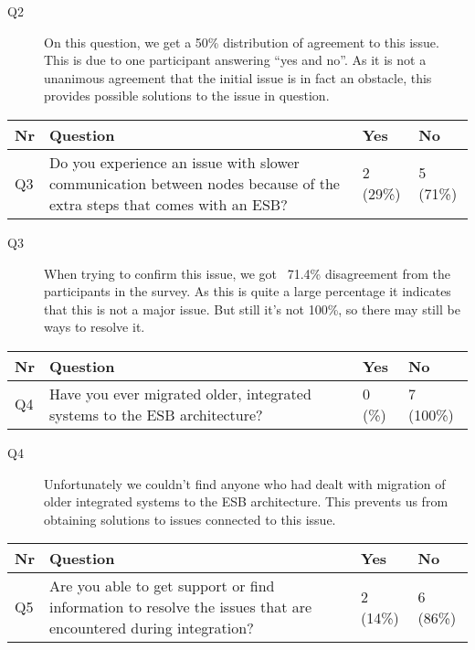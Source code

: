 \documentclass{llncs}
\begin{document}
\begin{description}
\item[Q2] On this question, we get a 50\% distribution of agreement to this issue. This is due to one participant answering “yes and no”. As it is not a unanimous agreement that the initial issue is in fact an obstacle, this provides possible solutions to the issue in question.
\end{description}

\begin{tabular}{ | l | p{9cm} | l | l |}
\hline
Nr & Question & Yes & No \\ \hline
Q3 & Do you experience an issue with slower communication between nodes because of the extra steps that comes with an ESB? & 2 (29\%) & 5 (71\%) \\ \hline
\end{tabular}

\begin{description}
\item[Q3] When trying to confirm this issue, we got ~71.4\% disagreement from the participants in the survey. As this is quite a large percentage it indicates that this is not a major issue. But still it’s not 100\%, so there may still be ways to resolve it.
\end{description}

\begin{tabular}{ | l | p{9cm} | l | l |}
\hline
Nr & Question & Yes & No \\ \hline
Q4 & Have you ever migrated older, integrated systems to the ESB architecture? & 0 (\%) & 7 (100\%) \\ \hline
\end{tabular}

\begin{description}
\item[Q4]  Unfortunately we couldn't find anyone who had dealt with migration of older integrated systems to the ESB architecture. This prevents us from obtaining solutions to issues connected to this issue.
\end{description}

\begin{tabular}{ | l | p{9cm} | l | l |}
\hline
Nr & Question & Yes & No\\ \hline
Q5 & Are you able to get support or find information to resolve the issues that are encountered during integration? & 2 (14\%) & 6 (86\%)\\ \hline
\end{tabular}
\end{document}
